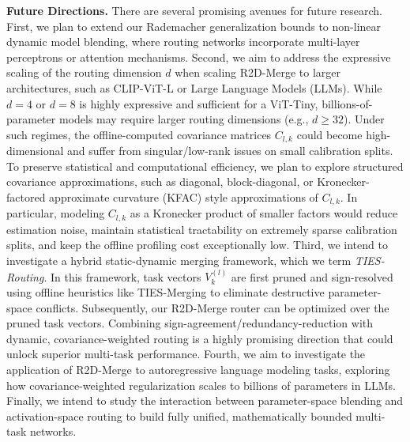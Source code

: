 \textbf{Future Directions.} There are several promising avenues for future research. 
First, we plan to extend our Rademacher generalization bounds to non-linear dynamic model blending, where routing networks incorporate multi-layer perceptrons or attention mechanisms. 
Second, we aim to address the expressive scaling of the routing dimension $d$ when scaling R2D-Merge to larger architectures, such as CLIP-ViT-L or Large Language Models (LLMs). While $d=4$ or $d=8$ is highly expressive and sufficient for a ViT-Tiny, billions-of-parameter models may require larger routing dimensions (e.g., $d \geq 32$). Under such regimes, the offline-computed covariance matrices $C_{l,k}$ could become high-dimensional and suffer from singular/low-rank issues on small calibration splits. To preserve statistical and computational efficiency, we plan to explore structured covariance approximations, such as diagonal, block-diagonal, or Kronecker-factored approximate curvature (KFAC) style approximations of $C_{l, k}$. In particular, modeling $C_{l, k}$ as a Kronecker product of smaller factors would reduce estimation noise, maintain statistical tractability on extremely sparse calibration splits, and keep the offline profiling cost exceptionally low.
Third, we intend to investigate a hybrid static-dynamic merging framework, which we term \emph{TIES-Routing}. In this framework, task vectors $V_k^{(l)}$ are first pruned and sign-resolved using offline heuristics like TIES-Merging to eliminate destructive parameter-space conflicts. Subsequently, our R2D-Merge router can be optimized over the pruned task vectors. Combining sign-agreement/redundancy-reduction with dynamic, covariance-weighted routing is a highly promising direction that could unlock superior multi-task performance.
Fourth, we aim to investigate the application of R2D-Merge to autoregressive language modeling tasks, exploring how covariance-weighted regularization scales to billions of parameters in LLMs. 
Finally, we intend to study the interaction between parameter-space blending and activation-space routing to build fully unified, mathematically bounded multi-task networks.
